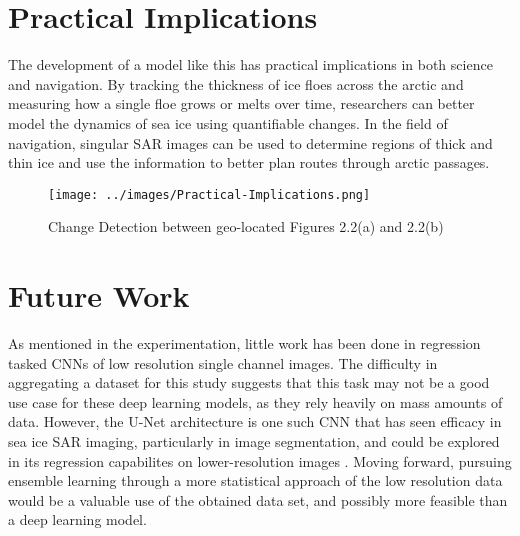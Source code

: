 \section{Practical Implications}
The development of a model like this has practical implications in both science and navigation. By tracking the thickness of ice floes across the arctic and measuring how a single floe grows or melts over time, researchers can better model the dynamics of sea ice using quantifiable changes. In the field of navigation, singular SAR images can be used to determine regions of thick and thin ice and use the information to better plan routes through arctic passages. 
\begin{figure}[h]
	\centering
	\texttt{[image: ../images/Practical-Implications.png]}
	\caption[Implications of LiDAR mapped SAR]{Change Detection between geo-located Figures 2.2(a) and 2.2(b)}
	\label{fig:change-detection}
\end{figure}


\section{Future Work}
As mentioned in the experimentation, little work has been done in regression tasked CNNs of low resolution single channel images. The difficulty in aggregating a dataset for this study suggests that this task may not be a good use case for these deep learning models, as they rely heavily on mass amounts of data. However, the U-Net architecture is one such CNN that has seen efficacy in sea ice SAR imaging, particularly in image segmentation, and could be explored in its regression capabilites on lower-resolution images \cite{SAR-U-Net}. Moving forward, pursuing ensemble learning through a more statistical approach of the low resolution data would be a valuable use of the obtained data set, and possibly more feasible than a deep learning model.
